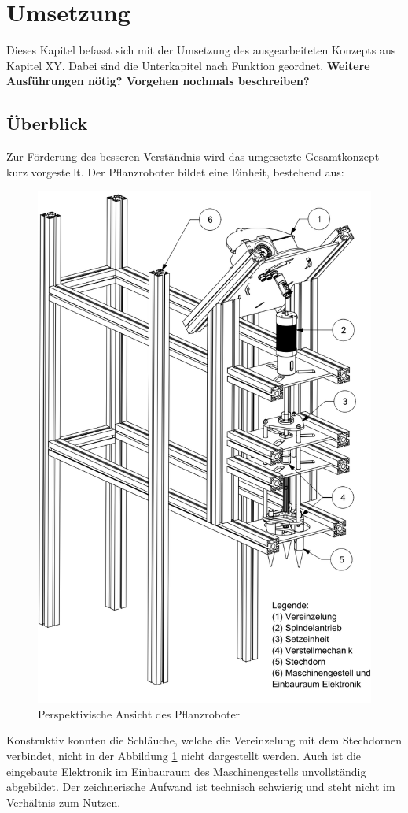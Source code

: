 \newpage
\section{Umsetzung} \label{kap:Umsetzung}
Dieses Kapitel befasst sich mit der Umsetzung des ausgearbeiteten Konzepts aus Kapitel XY. Dabei sind die Unterkapitel nach Funktion geordnet. \textbf{Weitere Ausführungen nötig? Vorgehen nochmals beschreiben?}
\newpage
\subsection{Überblick}
Zur Förderung des besseren Verständnis wird das umgesetzte Gesamtkonzept kurz vorgestellt.  Der Pflanzroboter bildet eine Einheit, bestehend aus:
	\begin{figure}[H]
	\includegraphics[scale=0.45]{Illustrationen/6-Umsetzung/uberblick.png}
	\caption{Perspektivische Ansicht des Pflanzroboter}
	\label{fig:uberblick}
	\end{figure}
Konstruktiv konnten die Schläuche, welche die Vereinzelung mit dem Stechdornen verbindet, nicht in der Abbildung \ref{fig:uberblick} nicht dargestellt werden. Auch ist die eingebaute Elektronik im Einbauraum des Maschinengestells unvollständig abgebildet. Der zeichnerische Aufwand ist technisch schwierig und steht nicht im Verhältnis zum Nutzen. 
